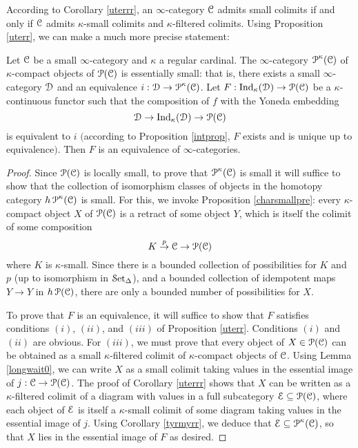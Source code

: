 According to Corollary \ref{uterrr}, an $\infty$-category $\operatorname{\mathcal{C}}$ admits small colimits if and only if $\operatorname{\mathcal{C}}$ admits $\kappa$-small colimits and $\kappa$-filtered colimits. Using Proposition \ref{uterr}, we can make a much more precise statement:

\begin{proposition}\label{precst}
Let $\operatorname{\mathcal{C}}$ be a small $\infty$-category and $\kappa$ a regular cardinal. The $\infty$-category
$\operatorname{\mathcal{P}}^{\kappa}(\operatorname{\mathcal{C}})$ of $\kappa$-compact objects of $\operatorname{\mathcal{P}}(\operatorname{\mathcal{C}})$ is essentially small: that is, there exists a small $\infty$-category $\operatorname{\mathcal{D}}$ and an equivalence $i: \operatorname{\mathcal{D}} \rightarrow
\operatorname{\mathcal{P}}^{\kappa}(\operatorname{\mathcal{C}})$. Let $F: \operatorname{Ind}_{\kappa}(\operatorname{\mathcal{D}}) \rightarrow \operatorname{\mathcal{P}}(\operatorname{\mathcal{C}})$
be a $\kappa$-continuous functor such that the composition of $f$ with the Yoneda embedding
$$ \operatorname{\mathcal{D}} \rightarrow \operatorname{Ind}_{\kappa}(\operatorname{\mathcal{D}}) \rightarrow \operatorname{\mathcal{P}}(\operatorname{\mathcal{C}})$$
is equivalent to $i$ $($according to Proposition \ref{intprop}, $F$ exists and is unique up
to equivalence$)$. Then $F$ is an equivalence of $\infty$-categories.
\end{proposition}

\begin{proof}
Since $\operatorname{\mathcal{P}}(\operatorname{\mathcal{C}})$ is locally small, to prove that $\operatorname{\mathcal{P}}^{\kappa}(\operatorname{\mathcal{C}})$ is small it will suffice to show that the collection of isomorphism classes of objects in the homotopy category
$h \operatorname{\mathcal{P}}^{\kappa}(\operatorname{\mathcal{C}})$ is small. For this, we invoke Proposition \ref{charsmallpre}:
every $\kappa$-compact object $X$ of $\operatorname{\mathcal{P}}(\operatorname{\mathcal{C}})$ is a retract of some object $Y$, which is
itself the colimit of some composition
$$ K \stackrel{p}{\rightarrow} \operatorname{\mathcal{C}} \rightarrow \operatorname{\mathcal{P}}(\operatorname{\mathcal{C}})$$
where $K$ is $\kappa$-small. Since there is a bounded collection of possibilities
for $K$ and $p$ (up to isomorphism in $\operatorname{\mathcal{S}et_{\Delta}}$), and a bounded collection of idempotent maps $Y \rightarrow Y$ in $h \operatorname{\mathcal{P}}(\operatorname{\mathcal{C}})$, there are only a bounded number of possibilities for $X$.

To prove that $F$ is an equivalence, it will suffice to show that $F$ satisfies conditions $(i)$, $(ii)$, and $(iii)$ of Proposition \ref{uterr}. 
Conditions $(i)$ and $(ii)$ are obvious. For $(iii)$, we must prove that every object of
$X \in \operatorname{\mathcal{P}}(\operatorname{\mathcal{C}})$ can be obtained as a small $\kappa$-filtered colimit of $\kappa$-compact objects of $\operatorname{\mathcal{C}}$. Using Lemma \ref{longwait0}, we can write $X$ as a small colimit
taking values in the essential image of $j: \operatorname{\mathcal{C}} \rightarrow \operatorname{\mathcal{P}}(\operatorname{\mathcal{C}})$. The proof of Corollary \ref{uterrr} shows that $X$ can be written as a $\kappa$-filtered colimit of a diagram with values
in a full subcategory $\operatorname{\mathcal{E}} \subseteq \operatorname{\mathcal{P}}(\operatorname{\mathcal{C}})$, where each object of $\operatorname{\mathcal{E}}$ is itself
a $\kappa$-small colimit of some diagram taking values in the essential image of $j$. Using Corollary \ref{tyrmyrr}, we deduce that $\operatorname{\mathcal{E}} \subseteq \operatorname{\mathcal{P}}^{\kappa}(\operatorname{\mathcal{C}})$, so that $X$ lies in the essential image of $F$ as desired.
\end{proof}


